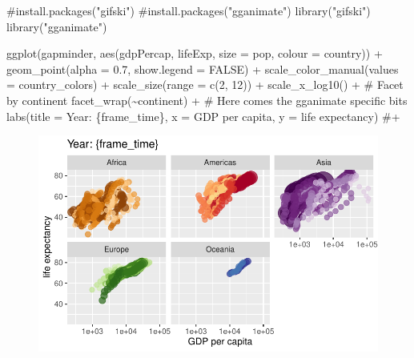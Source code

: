 \documentclass[
  letterpaper,
  DIV=11,
  numbers=noendperiod]{scrartcl}
\newenvironment{Shaded}{\begin{snugshade}}{\end{snugshade}}
\newcommand{\AttributeTok}[1]{\textcolor[rgb]{0.40,0.45,0.13}{#1}}
\newcommand{\CommentTok}[1]{\textcolor[rgb]{0.37,0.37,0.37}{#1}}
\newcommand{\ConstantTok}[1]{\textcolor[rgb]{0.56,0.35,0.01}{#1}}
\newcommand{\DecValTok}[1]{\textcolor[rgb]{0.68,0.00,0.00}{#1}}
\newcommand{\FloatTok}[1]{\textcolor[rgb]{0.68,0.00,0.00}{#1}}
\newcommand{\FunctionTok}[1]{\textcolor[rgb]{0.28,0.35,0.67}{#1}}
\newcommand{\NormalTok}[1]{\textcolor[rgb]{0.00,0.23,0.31}{#1}}
\newcommand{\SpecialCharTok}[1]{\textcolor[rgb]{0.37,0.37,0.37}{#1}}
\newcommand{\StringTok}[1]{\textcolor[rgb]{0.13,0.47,0.30}{#1}}
\begin{document}
\begin{Shaded}
\begin{Highlighting}[]
\CommentTok{\#install.packages("gifski")}
\CommentTok{\#install.packages("gganimate")}
\FunctionTok{library}\NormalTok{(}\StringTok{"gifski"}\NormalTok{)}
\FunctionTok{library}\NormalTok{(}\StringTok{"gganimate"}\NormalTok{)}

\FunctionTok{ggplot}\NormalTok{(gapminder, }\FunctionTok{aes}\NormalTok{(gdpPercap, lifeExp, }\AttributeTok{size =}\NormalTok{ pop, }\AttributeTok{colour =}\NormalTok{ country)) }\SpecialCharTok{+}
  \FunctionTok{geom\_point}\NormalTok{(}\AttributeTok{alpha =} \FloatTok{0.7}\NormalTok{, }\AttributeTok{show.legend =} \ConstantTok{FALSE}\NormalTok{) }\SpecialCharTok{+}
  \FunctionTok{scale\_color\_manual}\NormalTok{(}\AttributeTok{values =}\NormalTok{ country\_colors) }\SpecialCharTok{+}
  \FunctionTok{scale\_size}\NormalTok{(}\AttributeTok{range =} \FunctionTok{c}\NormalTok{(}\DecValTok{2}\NormalTok{, }\DecValTok{12}\NormalTok{)) }\SpecialCharTok{+}
  \FunctionTok{scale\_x\_log10}\NormalTok{() }\SpecialCharTok{+}
  \CommentTok{\# Facet by continent}
  \FunctionTok{facet\_wrap}\NormalTok{(}\SpecialCharTok{\textasciitilde{}}\NormalTok{continent) }\SpecialCharTok{+}
  \CommentTok{\# Here comes the gganimate specific bits}
  \FunctionTok{labs}\NormalTok{(}\AttributeTok{title =} \StringTok{\textquotesingle{}Year: \{frame\_time\}\textquotesingle{}}\NormalTok{, }\AttributeTok{x =} \StringTok{\textquotesingle{}GDP per capita\textquotesingle{}}\NormalTok{, }\AttributeTok{y =} \StringTok{\textquotesingle{}life expectancy\textquotesingle{}}\NormalTok{) }\CommentTok{\#+}
\end{Highlighting}
\end{Shaded}

\begin{figure}[H]

{\centering \includegraphics{class05_files/figure-pdf/unnamed-chunk-6-1.pdf}

}

\end{figure}
\end{document}
